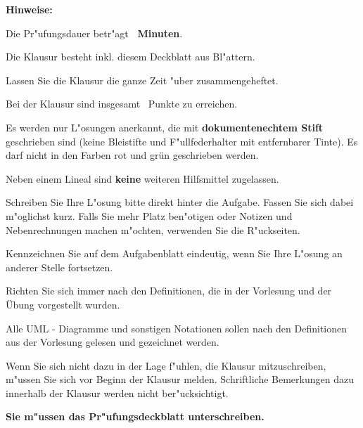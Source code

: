 \textbf{Hinweise:}
\begin{compactitem}
\item{Die Pr"ufungsdauer betr"agt \textbf{\VariableAmountMinutes~Minuten}}.
\item{Die Klausur besteht inkl. diesem Deckblatt aus \textbf{\pageref{LastPage}} Bl"attern.}
\item{Lassen Sie die Klausur die ganze Zeit "uber zusammengeheftet.}
\item{Bei der Klausur sind insgesamt \VariableAmountPoints~Punkte zu erreichen.}
\item{Es werden nur L"osungen anerkannt, die mit \textbf{dokumentenechtem Stift} geschrieben sind (keine Bleistifte und F"ullfederhalter mit entfernbarer Tinte). Es darf nicht in den Farben rot und grün geschrieben werden.}
\item{Neben einem Lineal sind \textbf{keine} weiteren Hilfsmittel zugelassen.}
\item{Schreiben Sie Ihre L"osung bitte direkt hinter die Aufgabe.
Fassen Sie sich dabei m"oglichst kurz. Falls Sie mehr Platz ben"otigen oder
Notizen und Nebenrechnungen machen m"ochten, verwenden Sie die R"uckseiten.}
\item{Kennzeichnen Sie auf dem Aufgabenblatt eindeutig, wenn Sie Ihre L"osung an anderer Stelle fortsetzen.}
\item{Richten Sie sich immer nach den Definitionen, die in der Vorlesung und der Übung vorgestellt wurden.}
\item{Alle UML - Diagramme und sonstigen Notationen sollen nach den Definitionen aus der Vorlesung gelesen und gezeichnet werden.}
\item{Wenn Sie sich nicht dazu in der Lage f"uhlen, die Klausur mitzuschreiben, m"ussen Sie sich vor Beginn der Klausur melden. Schriftliche Bemerkungen dazu innerhalb der Klausur werden nicht ber"ucksichtigt.}
\item{\textbf{Sie m"ussen das Pr"ufungsdeckblatt unterschreiben.}}
\end{compactitem}
